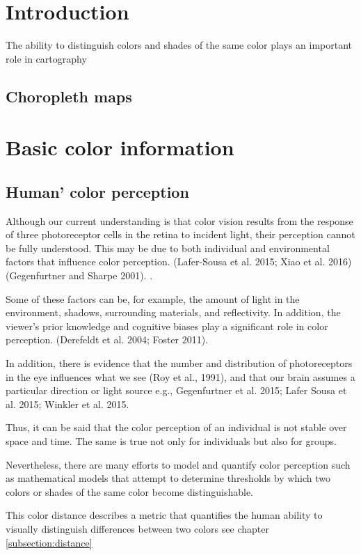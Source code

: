 \section{Introduction}
The ability to distinguish colors and shades of the same color plays an important role in cartography \parencite{coltekin2017}
\subsection{Choropleth maps}

\section{Basic color information}

\subsection{Human' color perception}
Although our current understanding is that color vision results from the response of three photoreceptor cells in the retina to incident light, their perception cannot be fully understood. This may be due to both individual and environmental factors that influence color perception. (Lafer-Sousa et al. 2015; Xiao et al. 2016) (Gegenfurtner and Sharpe 2001). .

Some of these factors can be, for example, the amount of light in the environment, shadows, surrounding materials, and reflectivity. In addition, the viewer's prior knowledge and cognitive biases play a significant role in color perception. (Derefeldt et al. 2004; Foster 2011). 

In addition, there is evidence that the number and distribution of photoreceptors in the eye influences what we see (Roy et al., 1991), and that our brain assumes a particular direction or light source e.g., Gegenfurtner et al. 2015; Lafer Sousa et al. 2015; Winkler et al. 2015. 

Thus, it can be said that the color perception of an individual is not stable over space and time. The same is true not only for individuals but also for groups.  

Nevertheless, there are many efforts to model and quantify color perception such as mathematical models that attempt to determine thresholds by which two colors or shades of the same color become distinguishable. 

This color distance describes a metric that quantifies the human ability to visually distinguish differences between two colors see chapter \ref{subsection:distance} \parencite{coltekin2017} 

